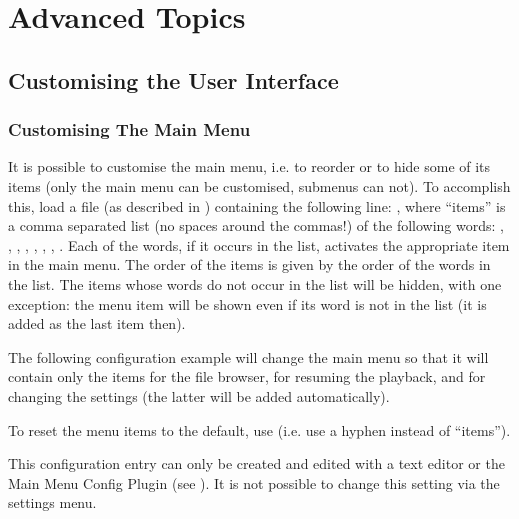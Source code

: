 \chapter{Advanced Topics}

\section{\label{ref:CustomisingUI}Customising the User Interface}

\subsection{\label{ref:CustomisingTheMainMenu}Customising The Main Menu}

It is possible to customise the main menu, i.e. to reorder or to hide some
of its items (only the main menu can be customised, submenus can not).
To accomplish this, load a  file (as described in
) containing the following line:
, where ``items'' is a comma separated list
(no spaces around the commas!) of the following
words: , , %
, , %
, ,
, .
Each of the words, if it occurs in the list, activates the appropriate item
in the main menu. The order of the items is given by the order of the words
in the list. The items whose words do not occur in the list will be hidden,
with one exception: the menu item  will be shown even if
its word is not in the list (it is added as the last item then).

The following configuration example will change the main menu so that it will
contain only the items for the file browser, for resuming the playback, and
for changing the settings (the latter will be added automatically).
\begin{example}
\end{example}


To reset the menu items to the default, use  (i.e.
use a hyphen instead of ``items'').

This configuration entry can only be created and edited with a text editor or
the Main Menu Config Plugin (see ).
It is not possible to change this setting via the settings menu.

